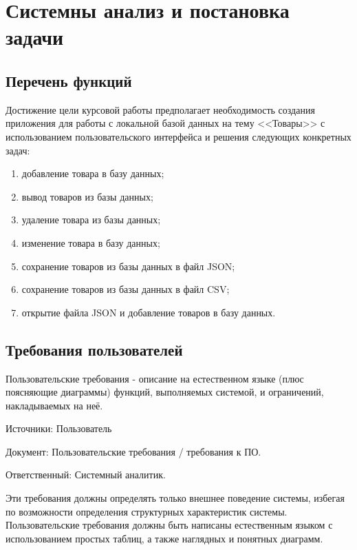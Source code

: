 \newpage

\section{Системны анализ и постановка задачи}


\subsection{Перечень функций}

Достижение цели курсовой работы предполагает необходимость создания приложения
для работы с локальной базой данных на тему <<Товары>> с использованием пользовательского
интерфейса и решения следующих конкретных задач:

\begin{enumerate}
    \item добавление товара в базу данных;
    \item вывод товаров из базы данных;
    \item удаление товара из базы данных;
    \item изменение товара в базу данных;
    \item сохранение товаров из базы данных в файл JSON;
    \item сохранение товаров из базы данных в файл CSV;
    \item открытие файла JSON и добавление товаров в базу данных.
\end{enumerate}


\subsection{Требования пользователей}

Пользовательские требования - описание на естественном языке (плюс поясняющие диаграммы) функций,
выполняемых системой, и ограничений, накладываемых на неё.

Источники: Пользователь

Документ: Пользовательские требования / требования к ПО.

Ответственный: Системный аналитик.

Эти требования должны определять только внешнее поведение системы,
избегая по возможности определения структурных характеристик системы.
Пользовательские требования должны быть написаны естественным языком с использованием
простых таблиц, а также наглядных и понятных диаграмм.

